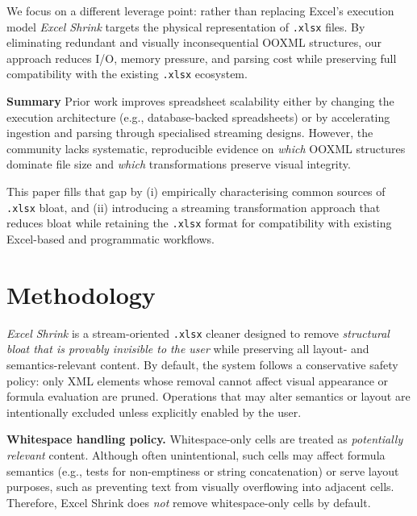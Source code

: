 \documentclass[conference]{IEEEtran}
\begin{document}
We focus on a different leverage point:
rather than replacing Excel's execution model
\textit{Excel Shrink} targets the physical representation of \texttt{.xlsx} files.
By eliminating redundant and visually inconsequential OOXML structures,
our approach reduces I/O, memory pressure, and parsing cost while preserving
full compatibility with the existing \texttt{.xlsx} ecosystem.


\textbf{Summary}
Prior work improves spreadsheet scalability either by changing the execution
architecture (e.g., database-backed spreadsheets) or by accelerating ingestion
and parsing through specialised streaming designs.
However, the community lacks systematic, reproducible evidence on
\emph{which} OOXML structures dominate file size
and \emph{which} transformations preserve visual integrity.

This paper fills that gap by
(i) empirically characterising common sources of \texttt{.xlsx} bloat, and
(ii) introducing a streaming transformation approach that reduces bloat
while retaining the \texttt{.xlsx} format for compatibility with existing
Excel-based and programmatic workflows.


\section{Methodology}

\noindent \textit{Excel Shrink} is a stream-oriented \texttt{.xlsx} cleaner designed to remove
\emph{structural bloat that is provably invisible to the user}
while preserving all layout- and semantics-relevant content.
By default, the system follows a conservative safety policy:
only XML elements whose removal cannot affect visual appearance
or formula evaluation are pruned.
Operations that may alter semantics or layout are intentionally excluded
unless explicitly enabled by the user.

\textbf{Whitespace handling policy.}
Whitespace-only cells are treated as \emph{potentially relevant} content.
Although often unintentional, such cells may affect formula semantics
(e.g., tests for non-emptiness or string concatenation)
or serve layout purposes, such as preventing text from visually overflowing
into adjacent cells.
Therefore, Excel Shrink does \emph{not} remove whitespace-only cells by default.
\end{document}

